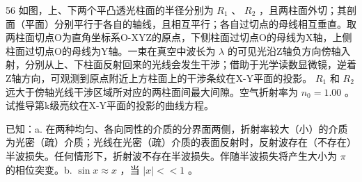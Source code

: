 \begin{problem}[33届物理竞赛复赛]{56}
    如图，上、下两个平凸透光柱面的半径分别为 $R_{1}$ 、 $R_{2}$ ，且两柱面外切；其剖面（平面）分别平行于各自的轴线，且相互平行；各自过切点的母线相互垂直。取两柱面切点O为直角坐标系O-XYZ的原点，下侧柱面过切点O的母线为X轴，上侧柱面过切点O的母线为Y轴。一束在真空中波长为 $\lambda$ 的可见光沿Z轴负方向傍轴入射，分别从上、下柱面反射回来的光线会发生干涉；借助于光学读数显微镜，逆着Z轴方向，可观测到原点附近上方柱面上的干涉条纹在X-Y平面的投影。 $R_{1}$ 和 $R_{2}$ 远大于傍轴光线干涉区域所对应的两柱面间最大间隙。空气折射率为 $n_{0}=1.00$ 。试推导第k级亮纹在X-Y平面的投影的曲线方程。

    已知：a. 在两种均匀、各向同性的介质的分界面两侧，折射率较大（小）的介质为光密（疏）介质；光线在光密（疏）介质的表面反射时，反射波存在（不存在）半波损失。任何情形下，折射波不存在半波损失。伴随半波损失将产生大小为 $\pi$ 的相位突变。b. $\sin x \approx x$ ，当 $|x| << 1$ 。
\end{problem}